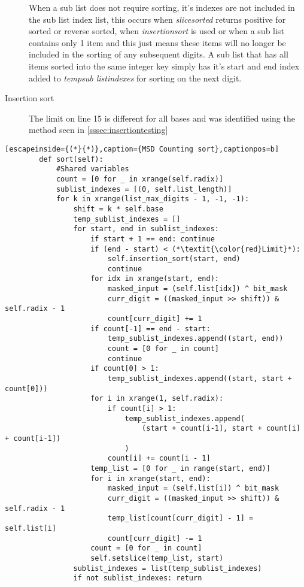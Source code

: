 \documentclass[12pt]{article}
\begin{document}
\begin{description}
	\par When a sub list does not require sorting, it's indexes are not included in the sub list index list, this occurs when \textit{slice\textunderscore sorted} returns positive for sorted or reverse sorted, when \textit{insertion\textunderscore sort} is used or when a sub list contains only 1 item and this just means these items will no longer be included in the sorting of any subsequent digits. A sub list that has all items sorted into the same integer key simply has it's start and end index added to \textit{temp\textunderscore sub list\textunderscore indexes} for sorting on the next digit.
	\item[Insertion sort] The limit on line 15 is different for all bases and was identified using the method seen in \ref{sssec:insertiontesting}
\end{description}
\begin{table}[H]
	\lstset{
		language=python,
    numbers=left,
    stepnumber=1,
    showstringspaces=false,
    tabsize=3,
    breaklines=true,
    breakatwhitespace=false,}
	\centering
	\begin{lstlisting}[escapeinside={(*}{*)},caption={MSD Counting sort},captionpos=b]
        def sort(self):
			#Shared variables
			count = [0 for _ in xrange(self.radix)]
			sublist_indexes = [(0, self.list_length)]
			for k in xrange(list_max_digits - 1, -1, -1):
				shift = k * self.base
				temp_sublist_indexes = []
				for start, end in sublist_indexes:
					if start + 1 == end: continue
					if (end - start) < (*\textit{\color{red}Limit}*):
						self.insertion_sort(start, end)
						continue
					for idx in xrange(start, end):
						masked_input = (self.list[idx]) ^ bit_mask
						curr_digit = ((masked_input >> shift)) & self.radix - 1
						count[curr_digit] += 1
					if count[-1] == end - start:
						temp_sublist_indexes.append((start, end))
						count = [0 for _ in count]
						continue
					if count[0] > 1:
						temp_sublist_indexes.append((start, start + count[0]))
					for i in xrange(1, self.radix):
						if count[i] > 1:
							temp_sublist_indexes.append(
								(start + count[i-1], start + count[i] + count[i-1])
							)
						count[i] += count[i - 1]
					temp_list = [0 for _ in range(start, end)]
					for i in xrange(start, end):
						masked_input = (self.list[i]) ^ bit_mask
						curr_digit = ((masked_input >> shift)) & self.radix - 1
						temp_list[count[curr_digit] - 1] = self.list[i]
						count[curr_digit] -= 1
					count = [0 for _ in count]
					self.setslice(temp_list, start)
				sublist_indexes = list(temp_sublist_indexes)
				if not sublist_indexes: return
\end{lstlisting}
\end{table}
\end{document}
